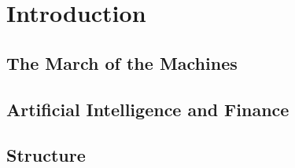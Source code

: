 \chapter{Introduction}

\section{The March of the Machines}

\section{Artificial Intelligence and Finance} 

\section{Structure}